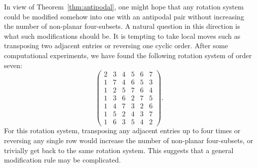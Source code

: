 \documentclass{article}
\theoremstyle{plain}
\theoremstyle{definition}
\theoremstyle{remark}
\begin{document}
In view of Theorem~\ref{thm:antipodal}, one might hope that any
rotation system could be modified somehow into one with an antipodal pair
without increasing the number of non-planar four-subsets. A natural question in this direction is what such modifications should be. It is tempting to take local moves such as transposing two adjacent entries or reversing one cyclic order. After some computational experiments, we have found the following rotation system of order seven:
\[\begin{pmatrix}
2&3&4&5&6&7\\
1&7&4&6&5&3\\
1&2&5&7&6&4\\
1&3&6&2&7&5\\
1&4&7&3&2&6\\
1&5&2&4&3&7\\
1&6&3&5&4&2
\end{pmatrix}.\] For this rotation system, transposing any adjacent entries up to four times or reversing any single row would increase the number of non-planar four-subsets, or trivially get back to the same rotation system. This suggests that a general modification rule may be complicated.
\end{document}
